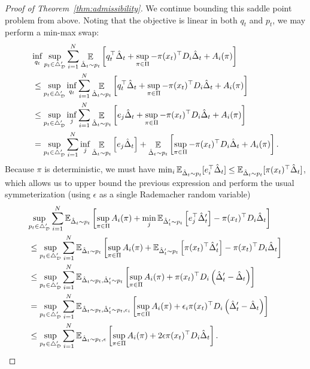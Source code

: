 \documentclass[11pt]{article}
\begin{document}
\begin{proof}[Proof of Theorem~\ref{thm:admissibility}]
We continue bounding this saddle point problem from above. Noting that the objective is linear in both $q_t$ and $p_t$, we may perform a min-max swap:
\begin{align*}
  &\lefteqn{
          \inf_{q_t}
      \sup_{p_t\in\triangle_{\mathcal D}'}\sum_{i=1}^N \mathop{\ex}_{\hat\Delta_t\sim p_t}\left[ q_t^\top \hat \Delta_t
    +
    \sup_{\pi\in\Pi} -\pi(x_t)^\top D_i\hat\Delta_t + A_i(\pi)\right]
    }\\
  &\leq
    \sup_{p_t\in\triangle_{\mathcal D}'}
    \inf_{q_t}    
    \sum_{i=1}^N \mathop{\ex}_{\hat\Delta_t\sim p_t}\left[ q_t^\top \hat \Delta_t
    +
    \sup_{\pi\in\Pi} -\pi(x_t)^\top D_i\hat\Delta_t + A_i(\pi)\right]\\
  &\leq
    \sup_{p_t\in\triangle_{\mathcal D}'}
    \inf_{j}  
    \sum_{i=1}^N \mathop{\ex}_{\hat\Delta_t\sim p_t}\left[ e_j \hat \Delta_t
    +
    \sup_{\pi\in\Pi} -\pi(x_t)^\top D_i\hat\Delta_t + A_i(\pi)\right]\\
  &=
    \sup_{p_t\in\triangle_{\mathcal D}'}
    \sum_{i=1}^N
    \inf_{j}  \mathop{\ex}_{\hat\Delta_t\sim p_t}\left[ e_j \hat \Delta_t\right]
    +
\mathop{\ex}_{\hat\Delta_t\sim p_t}\left[  \sup_{\pi\in\Pi} -\pi(x_t)^\top D_i\hat\Delta_t + A_i(\pi)\right]. 
\end{align*}
Because $\pi$ is deterministic, we must have $\min_i \mathbb E_{\hat\Delta_t \sim p_t}
[e_i^\top\hat\Delta_t] \leq \mathbb E_{\hat\Delta_t \sim p_t }[\pi(x_t)^\top\hat\Delta_t]$, which allows us to upper bound the previous expression and perform the usual symmeterization (using $\epsilon$ as a single Rademacher random variable)
\begin{align*}
  &\lefteqn{
    \sup_{p_t\in\triangle_{\mathcal D}'}
    \sum_{i=1}^N \ex_{\hat\Delta_t\sim p_t}\left[
     \sup_{\pi\in\Pi} A_i(\pi)
    +\min_j \ex_{\hat\Delta_t'\sim p_t}\left[e_j^\top \hat\Delta_t'\right]
    -\pi(x_t)^\top D_i \hat\Delta_t
  \right]
  }\\
  &\leq
    \sup_{p_t\in\triangle_{\mathcal D}'}
    \sum_{i=1}^N \ex_{\hat\Delta_t\sim p_t}\left[
     \sup_{\pi\in\Pi} A_i(\pi)
    +\ex_{\hat\Delta_t'\sim p_t}\left[\pi(x_t)^\top \hat\Delta_t'\right]
    -\pi(x_t)^\top D_i \hat\Delta_t
  \right]\\
  &\leq
    \sup_{p_t\in\triangle_{\mathcal D}'}
    \sum_{i=1}^N \ex_{\hat\Delta_t\sim p_t, \hat\Delta_t'\sim p_t}\left[
        \sup_{\pi\in\Pi} A_i(\pi)+
        \pi(x_t)^\top D_i\left(\hat\Delta_t'-\hat\Delta_t\right)
    \right]\\
  &=
    \sup_{p_t\in\triangle_{\mathcal D}'}
    \sum_{i=1}^N \ex_{\hat\Delta_t\sim p_t, \hat\Delta_t'\sim p_t,\epsilon_i}\left[
        \sup_{\pi\in\Pi} A_i(\pi)+
        \epsilon_i\pi(x_t)^\top D_i\left(\hat\Delta_t'-\hat\Delta_t\right)
    \right]\\
    &\leq
    \sup_{p_t\in\triangle_{\mathcal D}'}
    \sum_{i=1}^N \ex_{\hat\Delta_t\sim p_t,\epsilon}\left[
        \sup_{\pi\in\Pi} A_i(\pi)+
        2\epsilon\pi(x_t)^\top D_i\hat\Delta_t
        \right].
\end{align*}


\end{proof}
\end{document}
